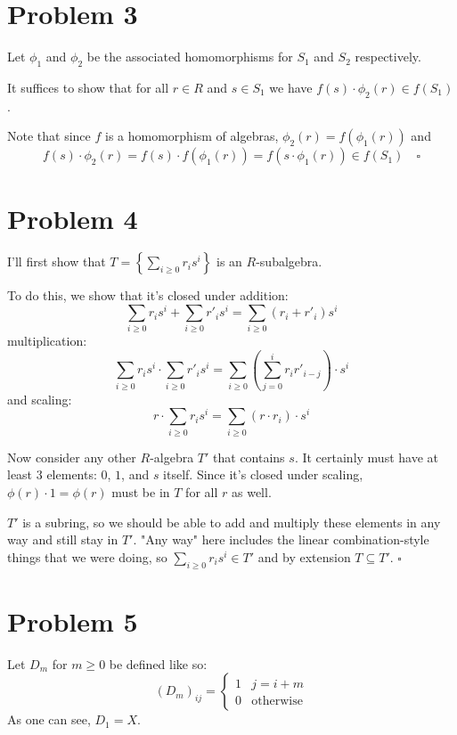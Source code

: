 \documentclass[12pt]{article}
\begin{document}
\pagebreak

\section{Problem 3}

Let $\phi_1$ and $\phi_2$ be the associated homomorphisms for $S_1$ and $S_2$ respectively.

It suffices to show that for all $r \in R$ and $s \in S_1$ we have $f(s) \cdot \phi_2(r) \in f(S_1)$.

Note that since $f$ is a homomorphism of algebras, $\phi_2(r)=f(\phi_1(r))$ and
\[f(s) \cdot \phi_2(r)=f(s) \cdot f(\phi_1(r))=f(s \cdot \phi_1(r)) \in f(S_1)\quad\square\]

\section{Problem 4}

I'll first show that $T=\left\{\sum_{i \ge 0} r_i s^i\right\}$ is an $R$-subalgebra.

To do this, we show that it's closed under addition:
\[\sum_{i \ge 0} r_i s^i + \sum_{i \ge 0} r'_i s^i
  = \sum_{i \ge 0} (r_i+r'_i) s^i\]
multiplication:
\[\sum_{i \ge 0} r_i s^i \cdot \sum_{i \ge 0} r'_i s^i
  = \sum_{i \ge 0} \left(\sum_{j=0}^{i} r_i r'_{i-j}\right) \cdot s^i\]
and scaling:
\[r \cdot \sum_{i \ge 0} r_i s^i = \sum_{i \ge 0} (r \cdot r_i) \cdot s^i\]

Now consider any other $R$-algebra $T'$ that contains $s$.
It certainly must have at least $3$ elements: $0$, $1$, and $s$ itself.
Since it's closed under scaling, $\phi(r) \cdot 1=\phi(r)$ must be in $T$
for all $r$ as well.

$T'$ is a subring, so we should be able to add and multiply these elements in any
way and still stay in $T'$.
"Any way" here includes the linear combination-style things that we were doing,
so $\sum_{i \ge 0} r_i s^i \in T'$ and by extension $T \subseteq T'$. $\square$

\pagebreak

\section{Problem 5}

Let $D_m$ for $m \ge 0$ be defined like so:
\[(D_m)_{ij}=\begin{cases}
    1 & j=i+m            \\
    0 & \text{otherwise}
  \end{cases}\]
As one can see, $D_1=X$.
\end{document}
